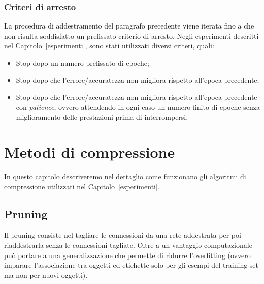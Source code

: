 \documentclass[11pt,a4paper,twoside,
openright]{book}
\begin{document}
\subsection*{Criteri di arresto}
\label{stopping}
La procedura di addestramento del paragrafo precedente viene iterata fino a che non risulta soddisfatto un prefissato criterio di arresto. Negli esperimenti descritti nel Capitolo~\ref{esperimenti}, sono stati utilizzati diversi criteri, quali:

\begin{itemize}
\item Stop dopo un numero prefissato di epoche;
\item Stop dopo che l'errore/accuratezza non migliora rispetto all'epoca precedente;
\item Stop dopo che l'errore/accuratezza non migliora rispetto all'epoca precedente con \textit{patience}, ovvero attendendo in ogni caso un numero finito di epoche senza miglioramento delle prestazioni prima di interrompersi.
\end{itemize}

\chapter{Metodi di compressione}
In questo capitolo descriveremo nel dettaglio come funzionano gli algoritmi di compressione utilizzati nel Capitolo~\ref{esperimenti}.
\section{Pruning}
Il pruning consiste nel tagliare le connessioni da una rete addestrata per poi riaddestrarla senza le connessioni tagliate.
Oltre a un vantaggio computazionale può portare a una generalizzazione che permette di ridurre l'overfitting (ovvero imparare l'associazione tra oggetti ed etichette solo per gli esempi del training set ma non per nuovi oggetti).
\end{document}
